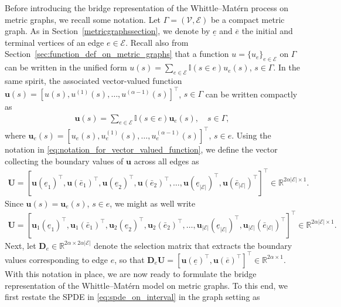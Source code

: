 \documentclass[11pt,a4paper]{article}
\theoremstyle{plain}
\theoremstyle{definition}
\begin{document}
Before introducing the bridge representation of the Whittle–Matérn process on metric graphs, we recall some notation. Let $\Gamma = (\mathcal{V}, \mathcal{E})$ be a compact metric graph. As in Section~\ref{metricgraphssection}, we denote by $\underline{e}$ and $\overline{e}$ the initial and terminal vertices of an edge $e \in \mathcal{E}$. Recall also from Section~\ref{sec:function_def_on_metric_graphs} that a function $u = \{u_e\}_{e\in\mathcal{E}}$ on $\Gamma$ can be written in the unified form $u(s) = \sum_{e\in\mathcal{E}} \mathbb{I}(s \in e)u_e(s)$, $s\in\Gamma$. In the same spirit, the associated vector-valued function $ \boldsymbol{u}(s) = [u(s),u^{(1)}(s),\dots,u^{(\alpha-1)}(s)]^\top$, $s\in\Gamma$ can be written compactly as
\begin{align}
\label{eq:notation_for_vector_valued_function}
    \boldsymbol{u}(s) = \sum_{e\in\mathcal{E}} \mathbb{I}(s \in e)\boldsymbol{u}_e(s),\quad s\in\Gamma,
\end{align}
where $\boldsymbol{u}_e(s) = [u_e(s),u_e^{(1)}(s),\dots,u_e^{(\alpha-1)}(s)]^\top$, $s\in e$. Using the notation in \eqref{eq:notation_for_vector_valued_function}, we define the vector collecting the boundary values of $\boldsymbol{u}$ across all edges as
\begin{align}
\label{eq:dens_u2}
   \mathbf{U} =  [\boldsymbol{u}(\underline{e}_1)^\top,
   \boldsymbol{u}(\bar{e}_1)^\top,
   \boldsymbol{u}(\underline{e}_2)^\top,
   \boldsymbol{u}(\bar{e}_2)^\top,
   \ldots,
	\boldsymbol{u}(\underline{e}_{|\mathcal{E}|})^\top,
   \boldsymbol{u}(\bar{e}_{|\mathcal{E}|})^\top]^\top\in\mathbb{R}^{2\alpha|\mathcal{E}|\times1}.
\end{align}
Since $\boldsymbol{u}(s)  = \boldsymbol{u}_e(s)$, $s\in e$, we might as well write 
\begin{align}
\label{eq:dens_u2version2}
   \mathbf{U} =  [\boldsymbol{u}_1(\underline{e}_1)^\top,
   \boldsymbol{u}_1(\bar{e}_1)^\top,
   \boldsymbol{u}_2(\underline{e}_2)^\top,
   \boldsymbol{u}_2(\bar{e}_2)^\top,
   \ldots,
	\boldsymbol{u}_{|\mathcal{E}|}(\underline{e}_{|\mathcal{E}|})^\top,
   \boldsymbol{u}_{|\mathcal{E}|}(\bar{e}_{|\mathcal{E}|})^\top]^\top\in\mathbb{R}^{2\alpha|\mathcal{E}|\times1}.
\end{align}
Next, let $\mathbf{D}_e \in \mathbb{R}^{2\alpha \times 2\alpha|\mathcal{E}|}$ denote the selection matrix that extracts the boundary values corresponding to edge $e$, so that
$\mathbf{D}_e \mathbf{U} = [\boldsymbol{u}(\underline{e})^\top, \boldsymbol{u}(\overline{e})^\top]^\top \in \mathbb{R}^{2\alpha \times 1}$. With this notation in place, we are now ready to formulate the bridge representation of the Whittle–Matérn model on metric graphs. To this end, we first restate the SPDE in \eqref{eq:spde_on_interval} in the graph setting as
\end{document}
